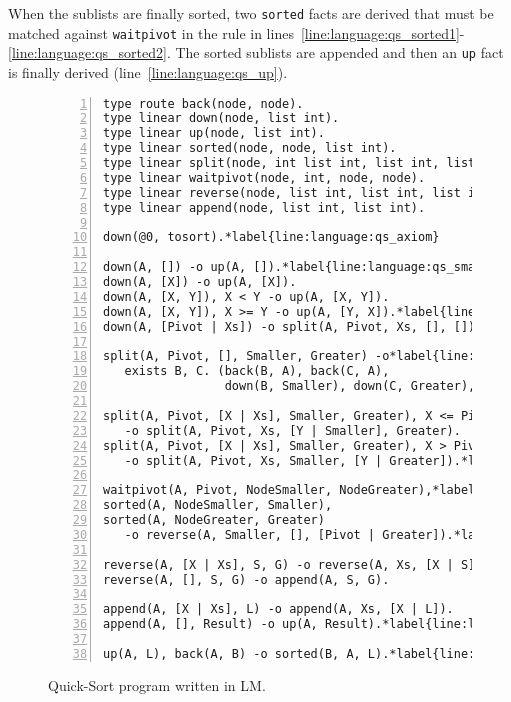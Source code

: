 When the sublists are finally sorted, two \texttt{sorted} facts are derived that
must be matched against \texttt{waitpivot} in the rule in
lines~\ref{line:language:qs_sorted1}-\ref{line:language:qs_sorted2}. The sorted
sublists are appended and then an \texttt{up} fact is finally derived
(line~\ref{line:language:qs_up}).

\begin{figure}[h!]
\begin{Verbatim}[numbers=left,fontsize=\codesize,commandchars=\*\{\}]
type route back(node, node).
type linear down(node, list int).
type linear up(node, list int).
type linear sorted(node, node, list int).
type linear split(node, int list int, list int, list int).
type linear waitpivot(node, int, node, node).
type linear reverse(node, list int, list int, list int).
type linear append(node, list int, list int).

down(@0, tosort).*label{line:language:qs_axiom}

down(A, []) -o up(A, []).*label{line:language:qs_small1}
down(A, [X]) -o up(A, [X]).
down(A, [X, Y]), X < Y -o up(A, [X, Y]).
down(A, [X, Y]), X >= Y -o up(A, [Y, X]).*label{line:language:qs_small2}
down(A, [Pivot | Xs]) -o split(A, Pivot, Xs, [], []).*label{line:language:qs_complex}

split(A, Pivot, [], Smaller, Greater) -o*label{line:language:qs_exists1}
   exists B, C. (back(B, A), back(C, A),
                 down(B, Smaller), down(C, Greater), waitpivot(A, Pivot, B, C)).*label{line:language:qs_exists2}

split(A, Pivot, [X | Xs], Smaller, Greater), X <= Pivot*label{line:language:qs_split1}
   -o split(A, Pivot, Xs, [Y | Smaller], Greater).
split(A, Pivot, [X | Xs], Smaller, Greater), X > Pivot
   -o split(A, Pivot, Xs, Smaller, [Y | Greater]).*label{line:language:qs_split2}
   
waitpivot(A, Pivot, NodeSmaller, NodeGreater),*label{line:language:qs_sorted1}
sorted(A, NodeSmaller, Smaller),
sorted(A, NodeGreater, Greater)
   -o reverse(A, Smaller, [], [Pivot | Greater]).*label{line:language:qs_sorted2}

reverse(A, [X | Xs], S, G) -o reverse(A, Xs, [X | S], G).
reverse(A, [], S, G) -o append(A, S, G).

append(A, [X | Xs], L) -o append(A, Xs, [X | L]).
append(A, [], Result) -o up(A, Result).*label{line:language:qs_up}

up(A, L), back(A, B) -o sorted(B, A, L).*label{line:language:qs_back}
\end{Verbatim}
  \caption{Quick-Sort program written in LM.}
  \label{language:code:quicksort}
\end{figure}

